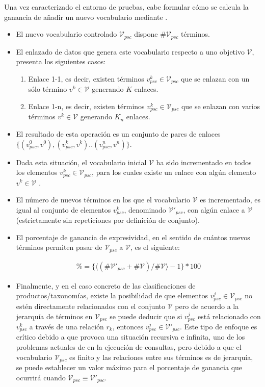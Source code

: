 \documentclass[a4paper,final,11pt,fleqn,twoside]{book}  %
\begin{document}
Una vez caracterizado el entorno de pruebas, cabe formular cómo se calcula la ganancia de añadir un nuevo vocabulario 
mediante \linkeddata.
\begin{itemize}
 \item El nuevo vocabulario controlado $\mathcal{V}_{psc}$ dispone $\#\mathcal{V}_{psc}$ términos.
 \item El enlazado de datos que genera este vocabulario respecto a uno objetivo $\mathcal{V}$, presenta los siguientes
casos:
\begin{enumerate}
 \item Enlace 1-1, es decir, existen términos $v^k_{psc} \in \mathcal{V}_{psc}$ que se enlazan con un sólo término $v^k \in \mathcal{V}$ 
generando $K$ enlaces.
 \item Enlace 1-n, es decir, existen términos $v^k_{psc} \in \mathcal{V}_{psc}$ que se enlazan con varios términos $v^k \in \mathcal{V}$ 
generando $K_n$ enlaces.
\end{enumerate}
\item El resultado de esta operación es un conjunto de pares de enlaces $\{ (v^0_{psc},v^0), (v^k_{psc},v^k)..(v^n_{psc},v^n) \}$.
\item Dada esta situación, el vocabulario inicial $\mathcal{V}$ ha sido incrementado en todos los elementos $v^k_{psc} \in \mathcal{V}_{psc}$, 
para los cuales existe un enlace con algún elemento $v^k \in \mathcal{V}$ .
\item El número de nuevos términos en los que el vocabulario $\mathcal{V}$ es incrementado, es igual al conjunto 
de elementos $v^k_{psc}$, denominado  $\mathcal{V'}_{psc}$, con algún enlace a $\mathcal{V}$ (estrictamente sin repeticiones por definición de conjunto).
\item El porcentaje de ganancia de expresividad, en el sentido de cuántos nuevos términos permiten pasar de $\mathcal{V}_{psc}$ a 
$\mathcal{V}$, es el siguiente:

\begin{align}
\% =  \{ \langle (\#\mathcal{V'}_{psc}+\#\mathcal{V}) / \#\mathcal{V} \rangle - 1 \} * 100
\end{align}

\item Finalmente, y en el caso concreto de las clasificaciones de productos/taxonomías, existe la posibilidad de que elementos 
$v^j_{psc} \in \mathcal{V}_{psc}$ no estén directamente relacionados con el conjunto $\mathcal{V}$ pero de acuerdo a la jerarquía 
de términos en $\mathcal{V}_{psc}$ se puede deducir que si $v^j_{psc}$ está relacionado con $v^k_{psc}$ a través de una relación $r_k$, 
entonces $v^j_{psc} \in \mathcal{V'}_{psc}$. Este tipo de enfoque es crítico debido a que provoca una situación recursiva e infinita, 
uno de los problemas actuales de \linkeddata en la ejecución de consultas, pero debido a que el vocabulario $\mathcal{V}_{psc}$ es 
finito y las relaciones entre sus términos es de jerarquía, se puede establecer un valor máximo para el porcentaje de 
ganancia que ocurrirá cuando $\mathcal{V}_{psc} \equiv \mathcal{V'}_{psc}$.

\end{itemize}
\end{document}
